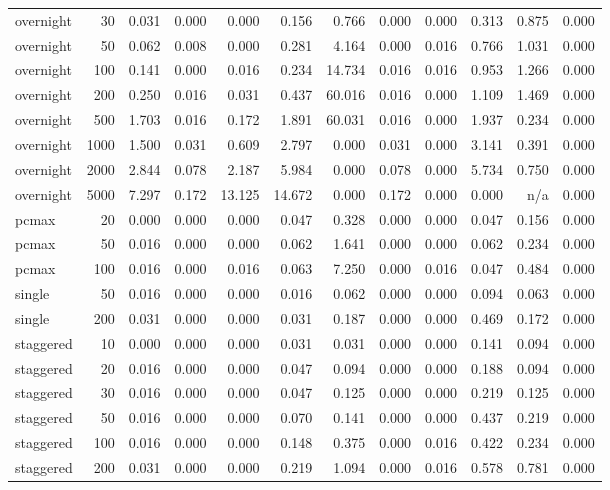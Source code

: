 \begin{table}[htbp]
\begin{tabular}{lrrrrrrrrrrr}
overnight & 30 & 0.031 & 0.000 & 0.000 & 0.156 & 0.766 & 0.000 & 0.000 & 0.313 & 0.875 & 0.000 \\
overnight & 50 & 0.062 & 0.008 & 0.000 & 0.281 & 4.164 & 0.000 & 0.016 & 0.766 & 1.031 & 0.000 \\
overnight & 100 & 0.141 & 0.000 & 0.016 & 0.234 & 14.734 & 0.016 & 0.016 & 0.953 & 1.266 & 0.000 \\
overnight & 200 & 0.250 & 0.016 & 0.031 & 0.437 & 60.016 & 0.016 & 0.000 & 1.109 & 1.469 & 0.000 \\
overnight & 500 & 1.703 & 0.016 & 0.172 & 1.891 & 60.031 & 0.016 & 0.000 & 1.937 & 0.234 & 0.000 \\
overnight & 1000 & 1.500 & 0.031 & 0.609 & 2.797 & 0.000 & 0.031 & 0.000 & 3.141 & 0.391 & 0.000 \\
overnight & 2000 & 2.844 & 0.078 & 2.187 & 5.984 & 0.000 & 0.078 & 0.000 & 5.734 & 0.750 & 0.000 \\
overnight & 5000 & 7.297 & 0.172 & 13.125 & 14.672 & 0.000 & 0.172 & 0.000 & 0.000 & n/a & 0.000 \\
pcmax & 20 & 0.000 & 0.000 & 0.000 & 0.047 & 0.328 & 0.000 & 0.000 & 0.047 & 0.156 & 0.000 \\
pcmax & 50 & 0.016 & 0.000 & 0.000 & 0.062 & 1.641 & 0.000 & 0.000 & 0.062 & 0.234 & 0.000 \\
pcmax & 100 & 0.016 & 0.000 & 0.016 & 0.063 & 7.250 & 0.000 & 0.016 & 0.047 & 0.484 & 0.000 \\
single & 50 & 0.016 & 0.000 & 0.000 & 0.016 & 0.062 & 0.000 & 0.000 & 0.094 & 0.063 & 0.000 \\
single & 200 & 0.031 & 0.000 & 0.000 & 0.031 & 0.187 & 0.000 & 0.000 & 0.469 & 0.172 & 0.000 \\
staggered & 10 & 0.000 & 0.000 & 0.000 & 0.031 & 0.031 & 0.000 & 0.000 & 0.141 & 0.094 & 0.000 \\
staggered & 20 & 0.016 & 0.000 & 0.000 & 0.047 & 0.094 & 0.000 & 0.000 & 0.188 & 0.094 & 0.000 \\
staggered & 30 & 0.016 & 0.000 & 0.000 & 0.047 & 0.125 & 0.000 & 0.000 & 0.219 & 0.125 & 0.000 \\
staggered & 50 & 0.016 & 0.000 & 0.000 & 0.070 & 0.141 & 0.000 & 0.000 & 0.437 & 0.219 & 0.000 \\
staggered & 100 & 0.016 & 0.000 & 0.000 & 0.148 & 0.375 & 0.000 & 0.016 & 0.422 & 0.234 & 0.000 \\
staggered & 200 & 0.031 & 0.000 & 0.000 & 0.219 & 1.094 & 0.000 & 0.016 & 0.578 & 0.781 & 0.000 \\

\end{tabular}
\end{table}
